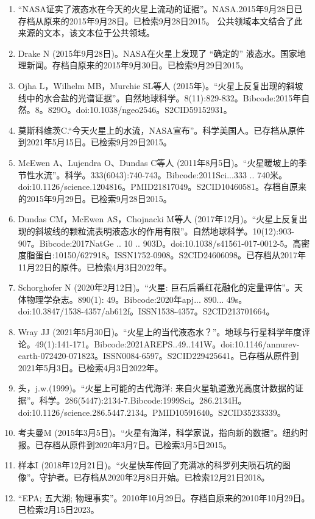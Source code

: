 \begin{enumerate}
\item “NASA证实了液态水在今天的火星上流动的证据”。NASA.2015年9月28日已存档从原来的2015年9月28日。已检索9月28日2015。 公共领域本文结合了此来源的文本，该文本位于公共领域。
\item Drake N (2015年9月28日)。NASA在火星上发现了 “确定的” 液态水。国家地理新闻。存档自原来的2015年9月30日。已检索9月29日2015。
\item Ojha L，Wilhelm MB，Murchie SL等人 (2015年)。“火星上反复出现的斜坡线中的水合盐的光谱证据”。自然地球科学。8(11):829-832。Bibcode:2015年自然。8。829O。doi:10.1038/ngeo2546。S2CID59152931。 
\item 莫斯科维茨C.“今天火星上的水流，NASA宣布”。科学美国人。已存档从原件到2021年5月15日。已检索9月29日2015。
\item McEwen A、Lujendra O、Dundas C等人 (2011年8月5日)。“火星暖坡上的季节性水流”。科学。333(6043):740-743。Bibcode:2011Sci...333 .. 740米。doi:10.1126/science.1204816。PMID21817049。S2CID10460581。存档自原来的2015年9月29日。已检索9月28日2015。  
\item Dundas CM，McEwen AS，Chojnacki M等人 (2017年12月)。“火星上反复出现的斜坡线的颗粒流表明液态水的作用有限”。自然地球科学。10(12):903-907。Bibcode:2017NatGe .. 10 .. 903D。doi:10.1038/s41561-017-0012-5。高密度脂蛋白:10150/627918。ISSN1752-0908。S2CID24606098。已存档从2017年11月22日的原件。已检索4月3日2022年。  
\item Schorghofer N (2020年2月12日)。“火星: 巨石后番红花融化的定量评估”。天体物理学杂志。890(1): 49。Bibcode:2020年apj... 890... 49s。doi:10.3847/1538-4357/ab612f。ISSN1538-4357。S2CID213701664。  
\item Wray JJ (2021年5月30日)。“火星上的当代液态水？”。地球与行星科学年度评论。49(1):141-171。Bibcode:2021AREPS..49..141W。doi:10.1146/annurev-earth-072420-071823。ISSN0084-6597。S2CID229425641。已存档从原件到2021年5月3日。已检索4月3日2022年。  
\item 头，j.w.(1999)。“火星上可能的古代海洋: 来自火星轨道激光高度计数据的证据”。科学。286(5447):2134-7.Bibcode:1999Sci。286.2134H。doi:10.1126/science.286.5447.2134。PMID10591640。S2CID35233339。  
\item 考夫曼M (2015年3月5日)。“火星有海洋，科学家说，指向新的数据”。纽约时报。已存档从原件到2020年3月7日。已检索3月5日2015。
\item 样本I (2018年12月21日)。“火星快车传回了充满冰的科罗列夫陨石坑的图像”。守护者。已存档从2020年2月8日开始。已检索12月21日2018。
\item “EPA; 五大湖; 物理事实”。2010年10月29日。存档自原来的2010年10月29日。已检索2月15日2023。

\end{enumerate}
